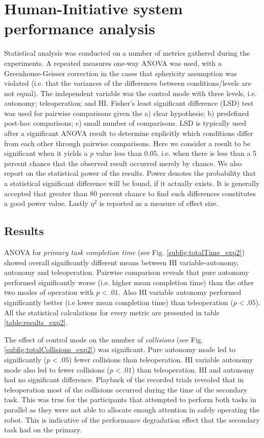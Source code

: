 \documentclass[a4paper,12pt,oneside,openright]{bhamthesis}
\begin{document}
\section{Human-Initiative system performance analysis}

Statistical analysis was conducted on a number of metrics gathered during the experiments. A repeated measures one-way ANOVA was used, with a Greenhouse-Geisser correction in the cases that sphericity assumption was violated (i.e. that the variances of the differences between conditions/levels are not equal). The independent variable was the control mode with three levels, i.e. autonomy; teleoperation; and HI. Fisher's least significant difference (LSD) test was used for pairwise comparisons given the a) clear hypothesis; b) predefined post-hoc comparisons; c) small number of comparisons. LSD is typically used after a significant ANOVA result to determine explicitly which conditions differ from each other through pairwise comparisons. Here we consider a result to be significant when it yields a $p$ value less than $0.05$, i.e. when there is less than a 5 percent chance that the observed result occurred merely by chance. We also report on the statistical power of the results. Power denotes the probability that a statistical significant difference will be found, if it actually exists. It is generally accepted that greater than 80 percent chance to find such differences constitutes a good power value. Lastly $\eta^2$ is reported as a measure of effect size.

\subsection{Results}\label{chapter4:results_system}
ANOVA for \textit{primary task completion time} (see Fig. \ref{subfig:totalTime_exp2}) showed overall significantly different means between HI variable-autonomy, autonomy and teleoperation. Pairwise comparison reveals that pure autonomy performed significantly worse (i.e. higher mean completion time) than the other two modes of operation with \textit{$p <.01$}. Also HI variable autonomy performed significantly better (i.e lower mean completion time) than teleoperation (\textit{$p <.05$}). All the statistical calculations for every metric are presented in table \ref{table:results_exp2}.

The effect of control mode on the number of \textit{collisions} (see Fig. \ref{subfig:totalCollisions_exp2}) was significant. Pure autonomy mode led to significantly (\textit{$p < .05$}) fewer collisions than teleoperation. HI variable autonomy mode also led to fewer collisions (\textit{$p < .01$}) than teleoperation. HI and autonomy had no significant difference. Playback of the recorded trials revealed that in teleoperation most of the collisions occurred during the time of the secondary task. This was true for the participants that attempted to perform both tasks in parallel as they were not able to allocate enough attention in safely operating the robot. This is indicative of the performance degradation effect that the secondary task had on the primary.
\end{document}
